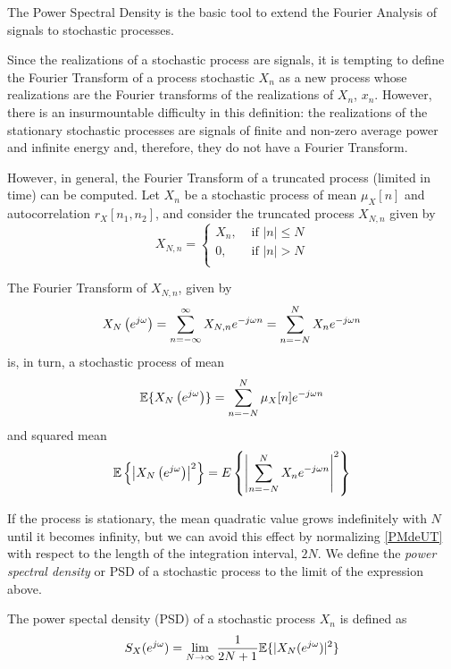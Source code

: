 The Power Spectral Density is the basic tool to extend the Fourier Analysis of signals to stochastic processes. 

Since the realizations of a stochastic process are signals, it is tempting to define the Fourier Transform of a process
stochastic $X_n$ as a new process whose realizations are the Fourier transforms of the realizations of $X_n$, $x_n$. However, there is an insurmountable difficulty in this definition: the realizations of the stationary stochastic processes are signals of finite and non-zero average power and infinite energy and, therefore, they do not have a Fourier Transform.

However, in general, the Fourier Transform of a truncated process (limited in time) can be computed. Let $X_n$ be a stochastic process of mean $\mu_X[n]$ and autocorrelation $r_X[n_1, n_2]$, and consider the truncated process $X_{N,n}$ given by
\begin{equation}
  X_{N,n} = \left\{\begin{array}{ll}
      X_n, & \text{  if } |n| \leq N \\
      0,   & \text{  if } |n| > N    \\
    \end{array}
  \right.
\end{equation}

The Fourier Transform of $X_{N,n}$, given by
\begin{equation}
X_N\left(e^{j \omega}\right)
	= \sum_{n=-\infty}^\infty X_{N,n} e^{-j \omega n}
    = \sum_{n=-N}^N X_n e^{-j \omega n}
\end{equation}
is, in turn, a stochastic process of mean
\begin{equation}
\mathbb{E}\{X_N\left(e^{j \omega}\right)\} 
	= \sum_{n=-N}^N \mu_X[n] e^{-j \omega n}
\end{equation}
and squared mean
\begin{equation}
\mathbb{E}\left\{\left|X_N\left(e^{j \omega}\right)\right|^2\right\} 
	= E\left\{\left|\sum_{n=-N}^N X_n e^{-j \omega n} \right|^2 \right \}
\label{PMdeUT}
\end{equation}

If the process is stationary, the mean quadratic value grows indefinitely with $N$ until it becomes infinity, but we can avoid this effect by normalizing \eqref{PMdeUT} with respect to the length of the integration interval, $2N$. We define the \textsl{power spectral density} or
PSD of a stochastic process to the limit of the expression above.

\begin{definition}
The power spectal density (PSD) of a stochastic process $X_n$ is defined as
\begin{equation}
S_X(e^{j \omega}) = \lim_{N \rightarrow \infty} \frac{1}{2N+1} \mathbb{E}\{|X_N(e^{j \omega})|^2\}
\label{defDEP}
\end{equation}
\end{definition}

